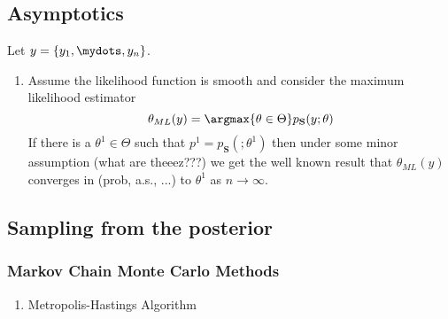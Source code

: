 \subsection{Asymptotics}
Let $y = \{y_1,\mydots,y_n\}$.
\begin{enumerate}
  \item Assume the likelihood function is smooth and consider the maximum likelihood estimator $$\theta_{ML}(y) = \argmax{\theta \in \Theta} p_{\mathbf{S}}(y; \theta)$$
    If there is a $\theta^1 \in \Theta$ such that $p^1 = p_{\mathbf{S}}(;\theta^1)$ then under some minor assumption (what are theeez???) we get the well known result that $\theta_{ML}(y)$ converges in (prob, a.s., ...) to $\theta^1$ as $n \to \infty$.
\end{enumerate}


\subsection{Sampling from the posterior}
\subsubsection*{Markov Chain Monte Carlo Methods}
\begin{enumerate}
  \item Metropolis-Hastings Algorithm
\end{enumerate}
